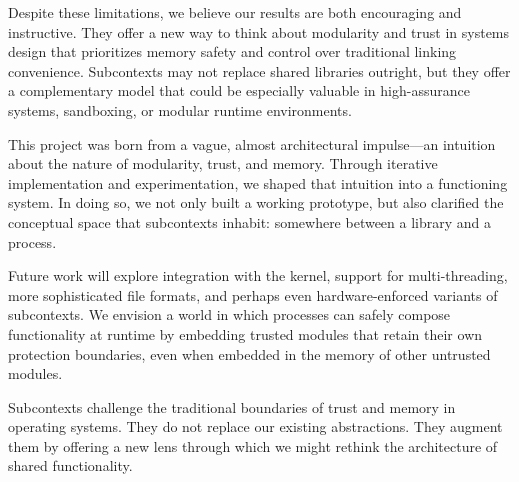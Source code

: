 Despite these limitations, we believe our results are both encouraging and instructive. They offer a new way to think about modularity and trust in systems design that prioritizes memory safety and control over traditional linking convenience. Subcontexts may not replace shared libraries outright, but they offer a complementary model that could be especially valuable in high-assurance systems, sandboxing, or modular runtime environments.

This project was born from a vague, almost architectural impulse—an intuition about the nature of modularity, trust, and memory. Through iterative implementation and experimentation, we shaped that intuition into a functioning system. In doing so, we not only built a working prototype, but also clarified the conceptual space that subcontexts inhabit: somewhere between a library and a process.

Future work will explore integration with the kernel, support for multi-threading, more sophisticated file formats, and perhaps even hardware-enforced variants of subcontexts. We envision a world in which processes can safely compose functionality at runtime by embedding trusted modules that retain their own protection boundaries, even when embedded in the memory of other untrusted modules.

Subcontexts challenge the traditional boundaries of trust and memory in operating systems. They do not replace our existing abstractions. They augment them by offering a new lens through which we might rethink the architecture of shared functionality.